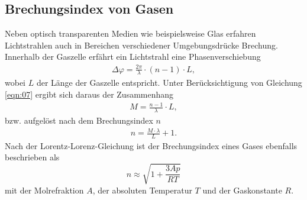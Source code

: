 \subsection{Brechungsindex von Gasen}
\noindent Neben optisch transparenten Medien wie beispielsweise Glas erfahren
Lichtstrahlen auch in Bereichen verschiedener Umgebungsdrücke Brechung.
Innerhalb der Gaszelle erfährt ein Lichtstrahl eine Phasenverschiebung
\begin{align}
  \Delta \varphi = \frac{2 \pi}{\lambda} \cdot (n - 1) \cdot L,
  \label{eqn:11}
\end{align}
\noindent wobei $L$ der Länge der Gaszelle entspricht. Unter Berücksichtigung
von Gleichung \ref{eqn:07} ergibt sich daraus der Zusammenhang
\begin{align}
  M = \frac{n-1}{\lambda} \cdot L,
  \label{eqn:12}
\end{align}
\noindent bzw. aufgelöst nach dem Brechungsindex $n$
\begin{align}
  n = \frac{M \cdot \lambda}{L} + 1.
  \label{eqn:13}
\end{align}
Nach der Lorentz-Lorenz-Gleichung ist der Brechungsindex eines Gases ebenfalls beschrieben als
\begin{equation}
  n \approx \sqrt{1+\frac{3 A p}{R T}}
  \label{eqn:Lorentz-Lorenz}
\end{equation}
mit der Molrefraktion $A$, der absoluten Temperatur $T$ und der Gaskonstante $R$.
